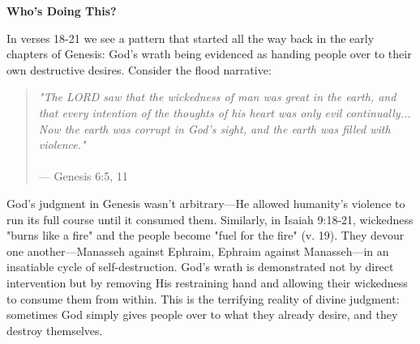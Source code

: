 \documentclass[11pt]{article}
\begin{document}
\vspace{3em}
{\large\bfseries Who's Doing This?}
\vspace{1em}

In verses 18-21 we see a pattern that started all the way back in the early chapters of Genesis: God's wrath being evidenced as handing people over to their own destructive desires. Consider the flood narrative:

\begin{quote}
\textit{"The LORD saw that the wickedness of man was great in the earth, and that every intention of the thoughts of his heart was only evil continually... Now the earth was corrupt in God's sight, and the earth was filled with violence."}\\\\
\hfill --- Genesis 6:5, 11
\end{quote}

God's judgment in Genesis wasn't arbitrary—He allowed humanity's violence to run its full course until it consumed them. Similarly, in Isaiah 9:18-21, wickedness "burns like a fire" and the people become "fuel for the fire" (v. 19). They devour one another—Manasseh against Ephraim, Ephraim against Manasseh—in an insatiable cycle of self-destruction. God's wrath is demonstrated not by direct intervention but by removing His restraining hand and allowing their wickedness to consume them from within. This is the terrifying reality of divine judgment: sometimes God simply gives people over to what they already desire, and they destroy themselves.
\end{document}

